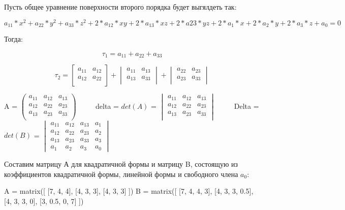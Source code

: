 \documentclass{article}
\begin{document}
Пусть общее уравнение поверхности второго порядка будет выгялдеть так:


$$a_{11}*x^2 + a_{22}*y^2 + a_{33}*z^2 + 2*a_{12}*xy  + 2*a_{13}*xz + 2*a{23}*yz  + 2*a_{1}*x + 2*a_{2}*y + 2*a_{3}*z + a_{0} = 0$$

Тогда:

$$\tau_{1} = a_{11} + a_{22} + a_{33}$$

$$\tau_{2} = \begin{bmatrix}
    a_{11} & a_{12} \\
    a_{12} & a_{22} \\
\end{bmatrix} + 
\begin{vmatrix}
    a_{11} & a_{13}\\
    a_{13} & a_{33}\\
\end{vmatrix} + 
\begin{vmatrix}
    a_{22} & a_{23}\\
    a_{23} & a_{33}\\
\end{vmatrix}$$

A = $\begin{pmatrix}
    a_{11} & a_{12} & a_{13}\\
    a_{12} & a_{22} & a_{23}\\
    a_{13} & a_{23} & a_{33}\\
\end{pmatrix}$
$\qquad$
delta = $det(A)$ = $\begin{vmatrix}
    a_{11} & a_{12} & a_{13}\\
    a_{12} & a_{22} & a_{23}\\
    a_{13} & a_{23} & a_{33}\\
\end{vmatrix}$
$\qquad$
Delta = $det(B)$ = $\begin{vmatrix}
    a_{11} & a_{12} & a_{13} & a_{1}\\
    a_{12} & a_{22} & a_{23} & a_{2}\\
    a_{13} & a_{23} & a_{33} & a_{3}\\
    a_{1} & a_{2}  & a_{3} &  a_{0}
\end{vmatrix}$


Составим матрицу А для квадратичной формы и матрицу B, состоящую из коэффициентов квадратичной формы, линейной формы и свободного члена $a_{0}$:

\begin{sageblock}
A = matrix([
    [7, 4, 4],
    [4, 3, 3],
    [4, 3, 3]
])
B = matrix([
    [7, 4, 4, 3],
    [4, 3, 3, 0.5],
    [4, 3, 3, 0],
    [3, 0.5, 0, 7]
])
\end{sageblock}
\end{document}
